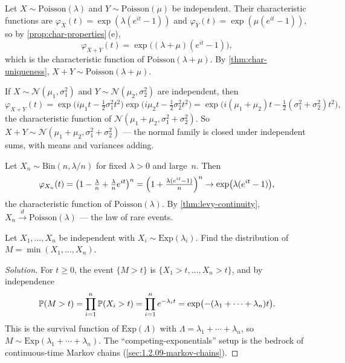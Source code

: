 \begin{example}
\label{ex:poisson-sum}
Let $X \sim \mathrm{Poisson}(\lambda)$ and $Y \sim \mathrm{Poisson}(\mu)$
be independent. Their characteristic functions are
$\varphi_X(t) = \exp(\lambda(e^{it} - 1))$ and
$\varphi_Y(t) = \exp(\mu(e^{it} - 1))$, so by
\cref{prop:char-properties}\,(e),
\[
  \varphi_{X + Y}(t) = \exp\bigl((\lambda + \mu)(e^{it} - 1)\bigr),
\]
which is the characteristic function of $\mathrm{Poisson}(\lambda + \mu)$.
By \cref{thm:char-uniqueness}, $X + Y \sim \mathrm{Poisson}(\lambda + \mu)$.
\end{example}

\begin{example}
\label{ex:normal-sum}
If $X \sim \mathcal{N}(\mu_1, \sigma_1^2)$ and
$Y \sim \mathcal{N}(\mu_2, \sigma_2^2)$ are independent, then
\[
  \varphi_{X + Y}(t) = \exp\bigl(i \mu_1 t - \tfrac{1}{2} \sigma_1^2 t^2\bigr) \exp\bigl(i \mu_2 t - \tfrac{1}{2} \sigma_2^2 t^2\bigr) = \exp\bigl(i(\mu_1 + \mu_2) t - \tfrac{1}{2}(\sigma_1^2 + \sigma_2^2) t^2\bigr),
\]
the characteristic function of
$\mathcal{N}(\mu_1 + \mu_2, \sigma_1^2 + \sigma_2^2)$. So
$X + Y \sim \mathcal{N}(\mu_1 + \mu_2, \sigma_1^2 + \sigma_2^2)$ —
the normal family is closed under independent sums, with means and
variances adding.
\end{example}

\begin{example}
\label{ex:poisson-approx-binomial}
Let $X_n \sim \mathrm{Bin}(n, \lambda/n)$ for fixed $\lambda > 0$ and
large~$n$. Then
\[
  \varphi_{X_n}(t) = \bigl(1 - \tfrac{\lambda}{n} + \tfrac{\lambda}{n} e^{it}\bigr)^n = \Bigl(1 + \tfrac{\lambda(e^{it} - 1)}{n}\Bigr)^n \to \exp\bigl(\lambda(e^{it} - 1)\bigr),
\]
the characteristic function of $\mathrm{Poisson}(\lambda)$. By
\cref{thm:levy-continuity}, $X_n \xrightarrow{d} \mathrm{Poisson}(\lambda)$ —
the law of rare events.
\end{example}

\begin{problem}
\label{prob:exponential-min}
Let $X_1, \dots, X_n$ be independent with $X_i \sim \mathrm{Exp}(\lambda_i)$.
Find the distribution of $M = \min(X_1, \dots, X_n)$.
\end{problem}

\begin{proof}[Solution]
For $t \geq 0$, the event $\{M > t\}$ is $\{X_1 > t, \dots, X_n > t\}$,
and by independence
\[
  \mathbb{P}(M > t) = \prod_{i=1}^{n} \mathbb{P}(X_i > t) = \prod_{i=1}^{n} e^{-\lambda_i t} = \exp\bigl(-(\lambda_1 + \cdots + \lambda_n) t\bigr).
\]
This is the survival function of $\mathrm{Exp}(\Lambda)$ with
$\Lambda = \lambda_1 + \cdots + \lambda_n$, so
$M \sim \mathrm{Exp}(\lambda_1 + \cdots + \lambda_n)$. The
``competing-exponentials'' setup is the bedrock of continuous-time
Markov chains (\cref{sec:1.2.09-markov-chains}).
\end{proof}
